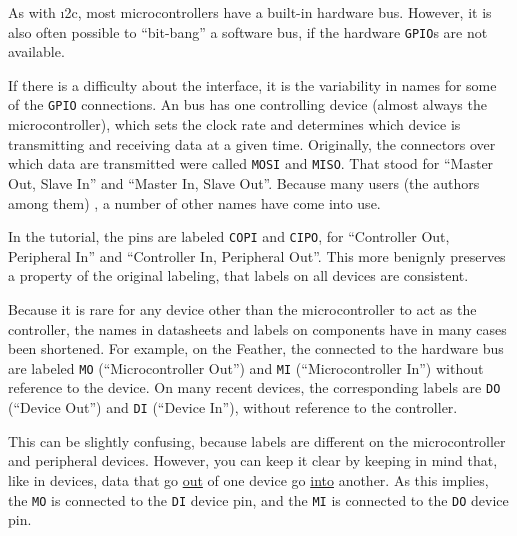 As with \i2c, most microcontrollers have a built-in hardware \spi bus.
However, it is also often possible to ``bit-bang'' a software \spi bus, if the hardware \texttt{GPIO}s are not available.

	\begin{kaobox}[frametitle=Name that pin!]
		If there is a difficulty about the \spi interface, it is the variability in names for some of the \texttt{GPIO} connections.
		An \spi bus has one controlling device (almost always the  microcontroller), which sets the clock rate and determines which device is transmitting and receiving data at a given time.
		Originally, the connectors over which data are transmitted were called \texttt{MOSI} and \texttt{MISO}.
		That stood for ``Master Out, Slave In'' and ``Master In, Slave Out''.
		Because many users (the authors among them) , a number of other names have come into use.

		In the  tutorial, the pins are labeled \texttt{COPI} and \texttt{CIPO}, for ``Controller Out, Peripheral In'' and ``Controller In, Peripheral Out''.
		This more benignly preserves a property of the original labeling, that labels on all devices are consistent.

		Because it is rare for any device other than the microcontroller to act as the controller, the names in datasheets and labels on components have in many cases been shortened.
		For example, on the  Feather, the \gpios connected to the hardware \spi bus are labeled \texttt{MO} (``Microcontroller Out'') and \texttt{MI} (``Microcontroller In'') without reference to the device.
		On many recent \spi devices, the corresponding labels are \texttt{DO} (``Device Out'') and \texttt{DI} (``Device In''), without reference to the controller.

		This can be slightly confusing, because labels are different on the microcontroller and peripheral devices.
	  However, you can keep it clear by keeping in mind that, like in \uart devices, data that go \underline{out} of one device go \underline{into} another.
	  As this implies, the \texttt{MO} \gpio is connected to the \texttt{DI} device pin, and the \texttt{MI} \gpio is connected to the \texttt{DO} device pin.
	\end{kaobox}


